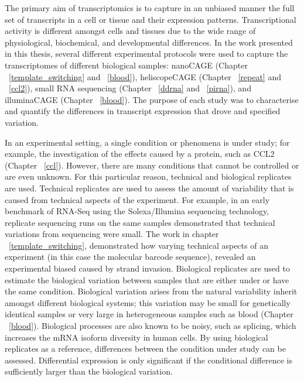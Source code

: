 The primary aim of transcriptomics is to capture in an unbiased manner the full set of transcripts in a cell or tissue and their expression patterns\cite{pmid19015660}. Transcriptional activity is different amongst cells and tissues due to the wide range of physiological, biochemical, and developmental differences. In the work presented in this thesis, several different experimental protocols were used to capture the transcriptomes of different biological samples: nanoCAGE\cite{pmid20543846} (Chapter ~\ref{template_switching} and ~\ref{blood}), heliscopeCAGE\cite{pmid21596820} (Chapter ~\ref{repeat} and ~\ref{ccl2}), small RNA sequencing\cite{pmid20964636} (Chapter ~\ref{ddrna} and ~\ref{pirna}), and illuminaCAGE\cite{Takahashi2012} (Chapter ~\ref{blood}). The purpose of each study was to characterise and quantify the differences in transcript expression that drove and specified variation.

In an experimental setting, a single condition or phenomena is under study; for example, the investigation of the effects caused by a protein, such as CCL2 (Chapter ~\ref{ccl}). However, there are many conditions that cannot be controlled or are even unknown. For this particular reason, technical and biological replicates are used. Technical replicates are used to assess the amount of variability that is caused from technical aspects of the experiment. For example, in an early benchmark of RNA-Seq using the Solexa/Illumina sequencing technology, replicate sequencing runs on the same samples demonstrated that technical variations from sequencing were small\cite{pmid18550803}. The work in chapter ~\ref{template_switching}, demonstrated how varying technical aspects of an experiment (in this case the molecular barcode sequence), revealed an experimental biased caused by strand invasion\cite{Tang01022013}. Biological replicates are used to estimate the biological variation between samples that are either under or have the same condition. Biological variation arises from the natural variability inherit amongst different biological systems; this variation may be small for genetically identical samples or very large in heterogeneous samples such as blood (Chapter ~\ref{blood}). Biological processes are also known to be noisy, such as splicing, which increases the mRNA isoform diversity in human cells\cite{pmid21151575}. By using biological replicates as a reference, differences between the condition under study can be assessed. Differential expression is only significant if the conditional difference is sufficiently larger than the biological variation.

